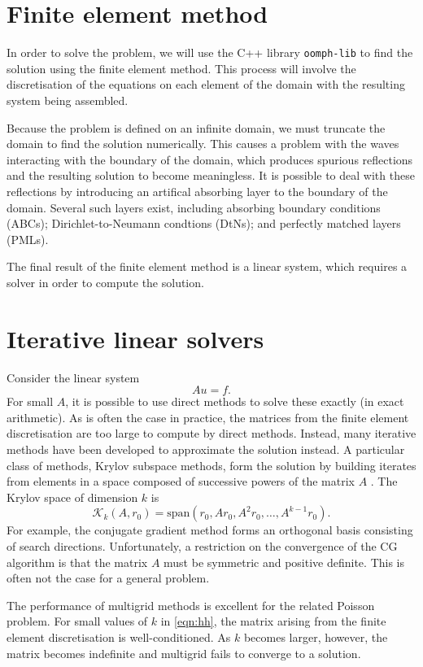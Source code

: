 \section{Finite element method}

In order to solve the problem, we will use the C++ library \texttt{oomph-lib} to find the solution using the finite element method.
This process will involve the discretisation of the equations on each element of the domain with the resulting system being assembled.

Because the problem is defined on an infinite domain, we must truncate the domain to find the solution numerically.
This causes a problem with the waves interacting with the boundary of the domain, which produces spurious reflections and the resulting solution to become meaningless.
It is possible to deal with these reflections by introducing an artifical absorbing layer to the boundary of the domain.
Several such layers exist, including absorbing boundary conditions (ABCs); Dirichlet-to-Neumann condtions (DtNs); and perfectly matched layers (PMLs).

The final result of the finite element method is a linear system, which requires a solver in order to compute the solution.

\section{Iterative linear solvers}

Consider the linear system
\[
	A u = f.
\]
For small $A$, it is possible to use direct methods to solve these exactly (in exact arithmetic).
As is often the case in practice, the matrices from the finite element discretisation are too large to compute by direct methods.
Instead, many iterative methods have been developed to approximate the solution instead.
A particular class of methods, Krylov subspace methods, form the solution by building iterates from elements in a space composed of successive powers of the matrix $A$ \citep{leveque}.
The Krylov space of dimension $k$ is 
\[
	\mathcal{K}_k(A, r_0) = \mathrm{span}(r_0, Ar_0, A^2 r_0, \ldots, A^{k-1} r_0).
\]
For example, the conjugate gradient method forms an orthogonal basis consisting of search directions.
Unfortunately, a restriction on the convergence of the CG algorithm is that the matrix $A$ must be symmetric and positive definite.
This is often not the case for a general problem.

The performance of multigrid methods is excellent for the related Poisson problem.
For small values of $k$ in \eqref{eqn:hh}, the matrix arising from the finite element discretisation is well-conditioned.
As $k$ becomes larger, however, the matrix becomes indefinite and multigrid fails to converge to a solution.

